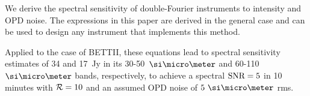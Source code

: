 We derive the spectral sensitivity of double-Fourier instruments to intensity and OPD noise. The expressions in this paper are derived in the general case and can be used to design any instrument that implements this method.

Applied to the case of BETTII, these equations lead to spectral sensitivity estimates of 34 and 17~Jy in its 30-50~$\um$ and 60-110~$\um$ bands, respectively, to achieve a spectral $\textrm{SNR}=5$ in 10 minutes with $\mathcal{R}=10$ and an assumed OPD noise of $5~\um$ rms.




%
%
%
%





